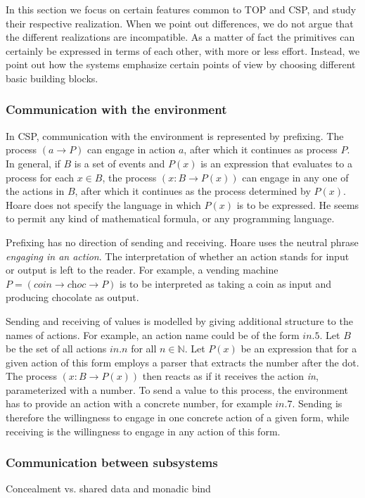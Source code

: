 In this section we focus on certain features common to TOP and CSP, and study their respective realization.
When we point out differences, we do not argue that the different realizations are incompatible.
As a matter of fact the primitives can certainly be expressed in terms of each other, with more or less effort.
Instead, we point out how the systems emphasize certain points of view by choosing different basic building blocks.

\subsubsection*{Communication with the environment}

In CSP, communication with the environment is represented by prefixing.
The process $(a \to P)$ can engage in action $a$, after which it continues as process $P$.
In general, if $B$ is a set of events and $P(x)$ is an expression that evaluates to a process for each $x \in B$, the process $(x:B \to P(x))$ can engage in any one of the actions in $B$, after which it continues as the process determined by $P(x)$.
Hoare does not specify the language in which $P(x)$ is to be expressed.
He seems to permit any kind of mathematical formula, or any programming language.

Prefixing has no direction of sending and receiving.
Hoare uses the neutral phrase \emph{engaging in an action}.
The interpretation of whether an action stands for input or output is left to the reader.
For example, a vending machine $P = (\textit{coin} \to \textit{choc} \to P)$ is to be interpreted as taking a coin as input and producing chocolate as output.

Sending and receiving of values is modelled by giving additional structure to the names of actions.
For example, an action name could be of the form $\textit{in}.5$.
Let $B$ be the set of all actions $\textit{in}.n$ for all $n \in \mathbb{N}$.
Let $P(x)$ be an expression that for a given action of this form employs a parser that extracts the number after the dot.
The process $(x:B \to P(x))$ then reacts as if it receives the action \textit{in}, parameterized with a number.
To send a value to this process, the environment has to provide an action with a concrete number, for example $\textit{in}.7$.
Sending is therefore the willingness to engage in one concrete action of a given form, while receiving is the willingness to engage in any action of this form.


\subsubsection*{Communication between subsystems}
Concealment vs. shared data and monadic bind

